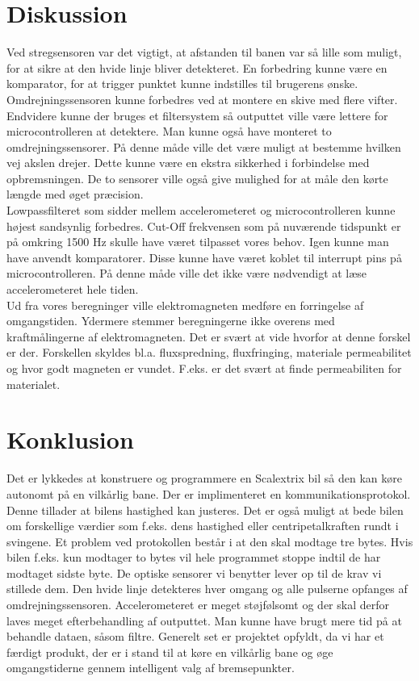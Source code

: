\section{Diskussion}
Ved stregsensoren var det vigtigt, at afstanden til banen var så lille som muligt, for at sikre at den hvide linje bliver detekteret. En forbedring kunne være en komparator, for at trigger punktet kunne indstilles til brugerens ønske.\\
Omdrejningssensoren kunne forbedres ved at montere en skive med flere vifter. Endvidere kunne der bruges et filtersystem så outputtet ville være lettere for microcontrolleren at detektere. Man kunne også have monteret to omdrejningssensorer. På denne måde ville det være muligt at bestemme hvilken vej akslen drejer. Dette kunne være en ekstra sikkerhed i forbindelse med opbremsningen. De to sensorer ville også give mulighed for at måle den kørte længde med øget præcision.\\
Lowpassfilteret som sidder mellem accelerometeret og microcontrolleren kunne højest sandsynlig forbedres. Cut-Off frekvensen som på nuværende tidspunkt er på omkring 1500 Hz skulle have været tilpasset vores behov. Igen kunne man have anvendt komparatorer. Disse kunne have været koblet til interrupt pins på microcontrolleren. På denne måde ville det ikke være nødvendigt at læse accelerometeret hele tiden.\\
Ud fra vores beregninger ville elektromagneten medføre en forringelse af omgangstiden. Ydermere stemmer beregningerne ikke overens med kraftmålingerne af elektromagneten. Det er svært at vide hvorfor at denne forskel er der. Forskellen skyldes bl.a. fluxspredning, fluxfringing, materiale permeabilitet og hvor godt magneten er vundet. F.eks. er det svært at finde permeabiliten for materialet.\\

\section{Konklusion}
Det er lykkedes at konstruere og programmere en Scalextrix bil så den kan køre autonomt på en vilkårlig bane. Der er implimenteret en kommunikationsprotokol. Denne tillader at bilens hastighed kan justeres. Det er også muligt at bede bilen om forskellige værdier som f.eks. dens hastighed eller centripetalkraften rundt i svingene. Et problem ved protokollen består i at den skal modtage tre bytes. Hvis bilen f.eks. kun modtager to bytes vil hele programmet stoppe indtil de har modtaget sidste byte.  
De optiske sensorer vi benytter lever op til de krav vi stillede dem. Den hvide linje detekteres hver omgang og alle pulserne opfanges af omdrejningssensoren. Accelerometeret er meget støjfølsomt og der skal derfor laves meget efterbehandling af outputtet. Man kunne have brugt mere tid på at behandle dataen, såsom filtre. 
Generelt set er projektet opfyldt, da vi har et færdigt produkt, der er i stand til at køre en vilkårlig bane og øge omgangstiderne gennem intelligent valg af bremsepunkter. 

